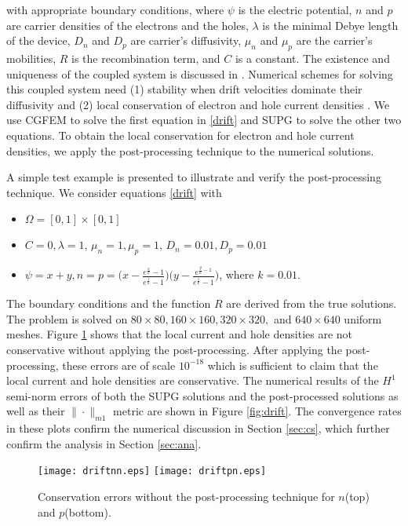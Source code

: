 \documentclass[times]{nlaauth}
\numberwithin{equation}{section}
\begin{document}
\noindent
with appropriate boundary conditions, where $\psi$ is the electric potential, $n$ and $p$ are carrier densities of the electrons and the holes, $\lambda$ is the minimal Debye length of the device, $D_n$ and $D_p$ are carrier's diffusivity, $\mu_n$ and $\mu_p$ are the carrier's mobilities, $R$ is the recombination term, and $C$ is a constant. The existence and uniqueness of the coupled system is discussed in \cite{mock1983analysis, gajewski1994uniqueness}. Numerical schemes for solving this coupled system need (1) stability when drift velocities dominate their diffusivity and (2) local conservation of electron and hole current densities \cite{bochev2013new}. We use CGFEM to solve the first equation in \eqref{drift} and SUPG to solve the other two equations. To obtain the local conservation for electron and hole current densities, we apply the post-processing technique to the numerical solutions.

A simple test example is presented to illustrate and verify the post-processing technique. We consider  equations \eqref{drift} with
\begin{itemize}
\item $\Omega = [0, 1]\times[0, 1]$
\item $C=0, \lambda =1$, $ \mu_n = 1,  \mu_p = 1$, $D_n = 0.01, D_p = 0.01$
\item $\psi = x + y, n = p = \Big( x - \frac{e^{ \frac{x} {k} } - 1}{e^{\frac{1} {k}} - 1 } \Big) \Big( y - \frac{e^{\frac{y} {k} - 1} }{e^{\frac{1} {k}} - 1 } \Big)$, where $k = 0.01.$
\end{itemize}

The boundary conditions and the function $R$ are derived from the true solutions. The problem is solved on $80\times 80, 160\times 160, 320\times 320,$ and $640\times 640$ uniform meshes. Figure \ref{fig:driftn} shows that the local current and hole densities are not conservative without applying the post-processing. After applying the post-processing, these errors are of scale $10^{-18}$ which is sufficient to claim that the local current and hole densities are conservative. The numerical results of the $H^1$ semi-norm errors of both the SUPG solutions and the post-processed solutions as well as their $\| \cdot \|_{m1}$ metric are shown in Figure \ref{fig:drift}. The convergence rates in these plots confirm the numerical discussion in Section \ref{sec:cs}, which further confirm the analysis in Section \ref{sec:ana}.

\begin{figure} 
\centering
\texttt{[image: driftnn.eps]}
\texttt{[image: driftpn.eps]}
\caption{Conservation errors without the post-processing technique for $n$(top) and $p$(bottom).}
\label{fig:driftn}
\end{figure}
\end{document}
